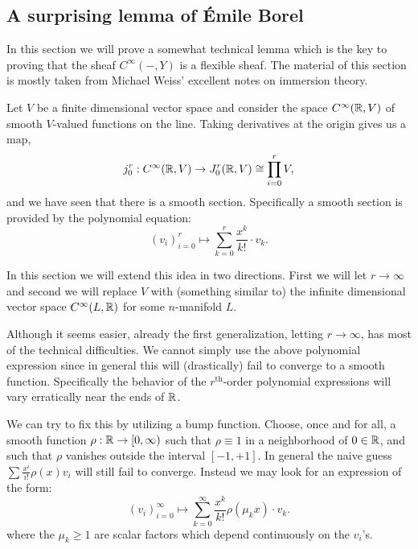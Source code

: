 \documentclass{article}
\newtheorem{proposed work}[theorem]{Proposed Work}
\begin{document}
\subsection{A surprising lemma of \'Emile Borel}

In this section we will prove a somewhat technical lemma which is the key to proving that the sheaf $C^\infty(-,Y)$ is a flexible sheaf. The material of this section is mostly taken from Michael Weiss' excellent notes on immersion theory. 



Let $V$ be a finite dimensional vector space and consider the space $C^\infty(\mathbb R, V)$ of smooth $V$-valued functions on the line. Taking derivatives at the origin gives us a map,
\begin{equation*}
	j^r_0: C^\infty(\mathbb R, V) \to J^r_0(\mathbb R, V) \cong \prod_{i=0}^r V,
\end{equation*}
and we have seen that there is a smooth section. Specifically a smooth section is provided by the polynomial equation:
\begin{equation*}
	(v_i)_{i=0}^{r} \mapsto \sum_{k=0}^r \frac{x^k}{k!} \cdot v_k.
\end{equation*}

In this section we will extend this idea in two directions. First we will let $r \to \infty$ and second we will replace $V$ with  (something similar to) the infinite dimensional vector space $C^\infty(L, \mathbb R)$ for some $n$-manifold $L$. 

Although it seems easier, already the first generalization, letting $r \to \infty$, has most of the technical difficulties. We cannot simply use the above polynomial expression since in general this will (drastically) fail to converge to a smooth function. Specifically the behavior of the $r^\textrm{th}$-order polynomial expressions will vary erratically near the ends of $\mathbb R$. 

We can try to fix this by utilizing a bump function. 
Choose, once and for all, a smooth function $\rho: \mathbb R \to [0, \infty)$ such that $\rho \equiv 1$ in a neighborhood of $0 \in \mathbb R$, and such that $\rho$ vanishes outside the interval $[-1,+1]$. In general the naive guess $\sum \frac{x^i}{i!} \rho(x) v_i$ will still fail to converge. Instead we may look for an expression of the form:
\begin{equation*}
	(v_i)_{i=0}^\infty \mapsto \sum_{k=0}^\infty \frac{x^k}{k!} \rho(\mu_k x) \cdot v_k.
\end{equation*}
where the $\mu_k \geq 1$ are scalar factors which depend continuously on the $v_i$'s. 
\end{document}
